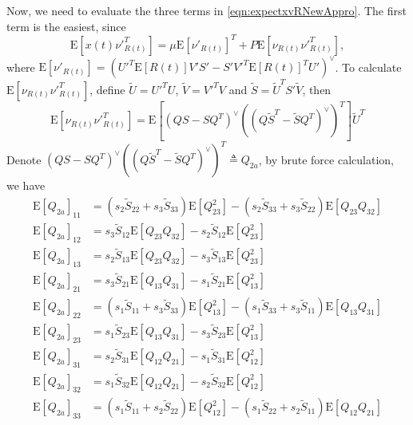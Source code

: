 \documentclass[10pt]{article}
\newcommand{\expect}[1]{\ensuremath{\mathrm{E}\left[ #1 \right]}}
\begin{document}
Now, we need to evaluate the three terms in \eqref{eqn:expectxvRNewAppro}.
The first term is the easiest, since
\begin{equation} \label{eqn:ExvRp}
	\expect{x(t)\nu'^T_{R(t)}} = \mu\expect{\nu'_{R(t)}}^T + P\expect{\nu_{R(t)}\nu'^T_{R(t)}},
\end{equation}
where $\expect{\nu'_{R(t)}} = (U'^T\expect{R(t)}V'S'-S'V'^T\expect{R(t)}^TU')^\vee$.
To calculate $\expect{\nu_{R(t)}\nu'^T_{R(t)}}$, define $\tilde{U} = U'^TU$, $\tilde{V} = V'^TV$ and $\tilde{S} = \tilde{U}^TS'\tilde{V}$, then
\begin{equation*}
	\expect{\nu_{R(t)}\nu'^T_{R(t)}} = \expect{(QS-SQ^T)^\vee\left((Q\tilde{S}^T-\tilde{S}Q^T)^\vee\right)^T}\tilde{U}^T
\end{equation*}
Denote $(QS-SQ^T)^\vee\left((Q\tilde{S}^T-\tilde{S}Q^T)^\vee\right)^T \triangleq Q_{2a}$, by brute force calculation, we have
\begin{align} \label{eqn:Q2a}
	\expect{Q_{2a}}_{11} &= (s_2\tilde{S}_{22}+s_3\tilde{S}_{33})\expect{Q_{23}^2} - (s_2\tilde{S}_{33}+s_3\tilde{S}_{22})\expect{Q_{23}Q_{32}} \nonumber \\
	\expect{Q_{2a}}_{12} &= s_3\tilde{S}_{12}\expect{Q_{23}Q_{32}} - s_2\tilde{S}_{12}\expect{Q_{23}^2} \nonumber \\
	\expect{Q_{2a}}_{13} &= s_2\tilde{S}_{13}\expect{Q_{23}Q_{32}} - s_3\tilde{S}_{13}\expect{Q_{23}^2} \nonumber \\
	\expect{Q_{2a}}_{21} &= s_3\tilde{S}_{21}\expect{Q_{13}Q_{31}} - s_1\tilde{S}_{21}\expect{Q_{13}^2} \nonumber \\
	\expect{Q_{2a}}_{22} &= (s_1\tilde{S}_{11}+s_3\tilde{S}_{33})\expect{Q_{13}^2} - (s_1\tilde{S}_{33}+s_3\tilde{S}_{11})\expect{Q_{13}Q_{31}} \nonumber \\
	\expect{Q_{2a}}_{23} &= s_1\tilde{S}_{23}\expect{Q_{13}Q_{31}} - s_3\tilde{S}_{23}\expect{Q_{13}^2} \nonumber \\
	\expect{Q_{2a}}_{31} &= s_2\tilde{S}_{31}\expect{Q_{12}Q_{21}} - s_1\tilde{S}_{31}\expect{Q_{12}^2} \nonumber \\
	\expect{Q_{2a}}_{32} &= s_1\tilde{S}_{32}\expect{Q_{12}Q_{21}} - s_2\tilde{S}_{32}\expect{Q_{12}^2} \nonumber \\
	\expect{Q_{2a}}_{33} &= (s_1\tilde{S}_{11}+s_2\tilde{S}_{22})\expect{Q_{12}^2} - (s_1\tilde{S}_{22}+s_2\tilde{S}_{11})\expect{Q_{12}Q_{21}}
\end{align}
\end{document}
